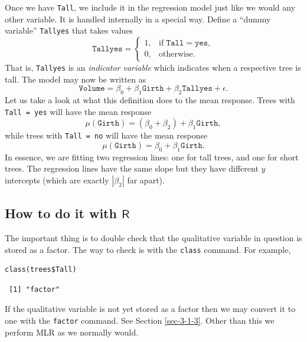 \documentclass[captions=tableheading]{scrbook}
\begin{document}
Once we have \texttt{Tall}, we include it in the regression model just like we would any other variable. It is handled internally in a special way. Define a ``dummy variable'' \texttt{Tallyes} that takes values
\begin{equation}
\mathtt{Tallyes}=
\begin{cases}
1, & \mbox{if }\mathtt{Tall}=\mathtt{yes},\\
0, & \mbox{otherwise.}
\end{cases}
\end{equation}
That is, \texttt{Tallyes} is an \emph{indicator variable} which indicates when a respective tree is tall. The model may now be written as 
\begin{equation}
\mathtt{Volume}=\beta_{0}+\beta_{1}\mathtt{Girth}+\beta_{2}\mathtt{Tallyes}+\epsilon.
\end{equation}
Let us take a look at what this definition does to the mean response. Trees with \texttt{Tall = yes} will have the mean response
\begin{equation}
\mu(\mathtt{Girth})=(\beta_{0}+\beta_{2})+\beta_{1}\mathtt{Girth},
\end{equation}
while trees with \texttt{Tall = no} will have the mean response
\begin{equation} 
\mu(\mathtt{Girth})=\beta_{0}+\beta_{1}\mathtt{Girth}.
\end{equation}
In essence, we are fitting two regression lines: one for tall trees, and one for short trees. The regression lines have the same slope but they have different \(y\) intercepts (which are exactly \(|\beta_{2}|\) far apart).
\subsection{How to do it with \(\mathsf{R}\)}
\label{sec-12-6-1}


The important thing is to double check that the qualitative variable in question is stored as a factor. The way to check is with the \texttt{class} command. For example,


\lstset{language=R}
\begin{lstlisting}
class(trees$Tall)
\end{lstlisting}

\begin{verbatim}
 [1] "factor"
\end{verbatim}

If the qualitative variable is not yet stored as a factor then we may convert it to one with the \texttt{factor} command. See Section \ref{sec-3-1-3}. Other than this we perform MLR as we normally would.
\end{document}
